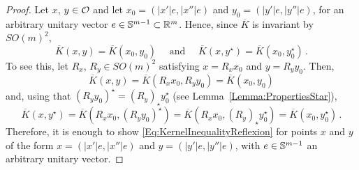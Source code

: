 \begin{proof}
Let $x$, $y \in \mathcal{O}$ and let $x_0 = (|x'|e, |x''|e)$ and $y_0 = (|y'|e, |y''|e)$, for an
arbitrary unitary vector $e \in \mathbb{S}^{m-1} \subset \mathbb{R}^m$. Hence, since $\overline{K}$ is invariant
by $SO(m)^2$,
$$
\overline{K}(x,y) = \overline{K}(x_0, y_0) \quad \text{ and } \quad \overline{K}(x,y^\star) = \overline{K}(x_0, y_0^\star)\,.
$$
To see this, let $R_x$, $R_y \in SO(m)^2$ satisfying $x = R_x x_0$ and $y = R_y y_0$. Then,
$$
\overline{K}(x,y) = \overline{K}(R_x x_0,R_y y_0)  = \overline{K}(x_0, y_0)
$$
and, using that $(R_y y_0)^\star = (R_y)_\star y_0^\star$ (see Lemma~\ref{Lemma:PropertiesStar}),
$$
\overline{K}(x,y^\star) = \overline{K}(R_x x_0,(R_y y_0)^\star) = \overline{K}(R_x x_0,(R_y)_\star y_0^\star)  = \overline{K}(x_0, y_0^\star)\,.
$$
Therefore, it is enough to show \eqref{Eq:KernelInequalityReflexion} for points $x$ and $y$ of the
form $x = (|x'|e, |x''|e)$ and $y = (|y'|e, |y''|e)$, with $e \in \mathbb{S}^{m-1}$ an arbitrary unitary
vector.


\end{proof}
